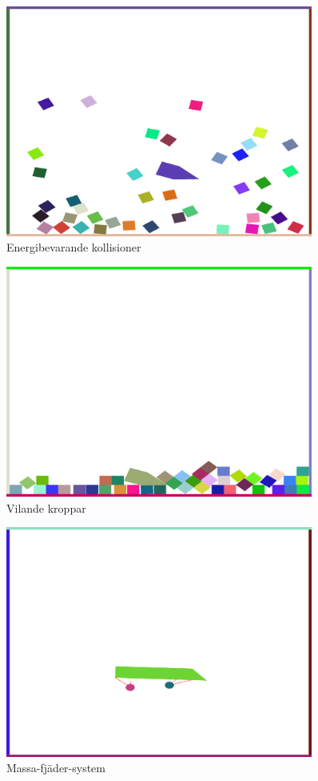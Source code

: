 \documentclass[a4paper,12pt,twopage,swedish]{article}
\begin{document}
\begin{figure}[H]
	\centering
	\includegraphics[width=0.9\textwidth]{illustrations/printscreen_general.png}
	\caption{Energibevarande kollisioner}
	\label{fig:general}
\end{figure}
\begin{figure}[H]
	\centering
	\includegraphics[width=0.9\textwidth]{illustrations/printscreen_resting.png}
	\caption{Vilande kroppar}
	\label{fig:resting}
\end{figure}
\begin{figure}[H]
	\centering
	\includegraphics[width=0.9\textwidth]{illustrations/printscreen_a_vagn_that_can_go.png}
	\caption{Massa-fjäder-system}
	\label{fig:vagn_that_can_go}
\end{figure}
\end{document}
